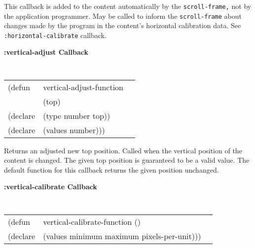 \begin{flushright} \parbox[t]{6.125in}{ 
This callback is added to the content
automatically by the {\tt scroll-frame,} not by the application programmer.  May
be called to inform the {\tt scroll-frame} about changes made by the program in
the content's horizontal calibration data. See {\tt :horizontal-calibrate}
callback.

}\end{flushright}

{\samepage
{\large {\bf :vertical-adjust \hfill Callback}} 
\begin{flushright} 
\parbox[t]{6.125in}{
\tt
\begin{tabular}{lll}
\raggedright
(defun & vertical-adjust-function & \\ 
& (top) \\
(declare &(type  number  top))\\
(declare & (values   number)))
\end{tabular}
\rm

}\end{flushright}}

\begin{flushright} \parbox[t]{6.125in}{ 
Returns an adjusted new top position.
Called when the vertical position of the content is changed.  The given top
position is guaranteed to be a valid value.  The default function for this
callback returns the given position unchanged.

}\end{flushright}


{\samepage
{\large {\bf :vertical-calibrate \hfill Callback}} 
\begin{flushright} 
\parbox[t]{6.125in}{
\tt
\begin{tabular}{lll}
\raggedright
(defun & vertical-calibrate-function () \\
(declare & (values   minimum maximum pixels-per-unit)))
\end{tabular}
\rm

}\end{flushright}}

